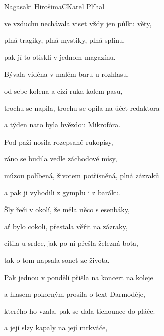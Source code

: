 \begin{song}{Nagasaki Hirošima}{C}{Karel Plíhal}
\begin{SBVerse}
ve vzduchu nechávala viset vždy jen půlku věty,

plná tragiky, plná mystiky, plná splínu,

pak jí to otiskli v jednom magazínu.
\end{SBVerse}

\begin{SBVerse}
Bývala viděna v malém baru u rozhlasu,

od sebe kolena a cizí ruka kolem pasu,

trochu se napila, trochu se opila na účet redaktora

a týden nato byla hvězdou Mikrofóra.
\end{SBVerse}

\begin{SBVerse}
Pod paží nosila rozepsané rukopisy,

ráno se budila vedle záchodové mísy,

múzou políbená, životem potřísněná, plná zázraků

a pak ji vyhodili z gymplu i z baráku.
\end{SBVerse}

\begin{SBVerse}
Šly řeči v okolí, že měla něco s esenbáky,

ať bylo cokoli, přestala věřit na zázraky,

cítila u srdce, jak po ní přešla železná bota,

tak o tom napsala sonet ze života.
\end{SBVerse}

\begin{SBVerse}
Pak jednou v pondělí přišla na koncert na koleje

a hlasem pokorným prosila o text Darmoděje,

kterého ho vzala, pak se dala tichounce do pláče.

a její slzy kapaly na její mrkváče,    
\end{SBVerse}
\end{song}

\clearpage
